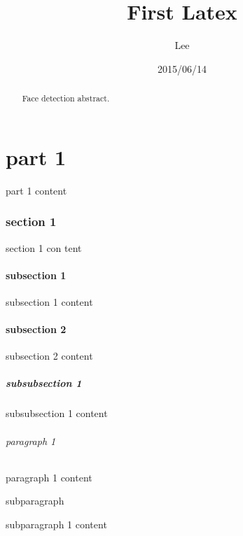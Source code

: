 \documentclass[10pt,a4paper,notitlepage,onecolumn]{article}
\title{First Latex}
\author{Lee}
\date{2015/06/14}
\begin{document}
\maketitle  %
\setcounter{tocdepth}{4}    %
\tableofcontents    %
    \begin{abstract}
        Face detection abstract.
    \end{abstract}
    \part{part 1}
            part 1 content
        \section{section 1}
             section 1 con tent
            \subsection{subsection 1}
                 subsection 1 content
            \subsection{subsection 2}
                subsection 2 content
                \subsubsection*{subsubsection 1}    %
                    subsubsection 1 content
                    \paragraph{paragraph 1}
                        paragraph 1 content    %
                        \subparagraph{subparagraph}
                            subparagraph 1 content
\end{document}
